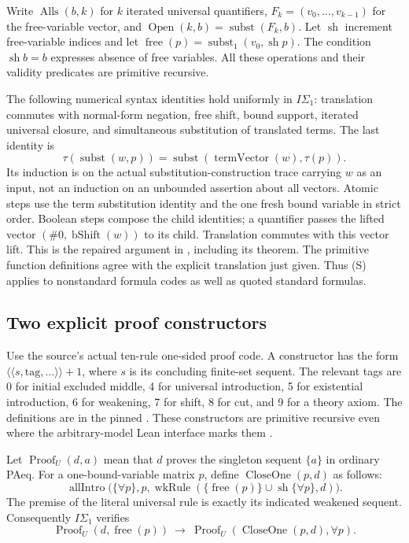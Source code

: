 Write $\operatorname{Alls}(b,k)$ for $k$ iterated universal quantifiers,
$F_k=(v_0,\ldots,v_{k-1})$ for the free-variable vector, and
$\operatorname{Open}(k,b)=\operatorname{subst}(F_k,b)$.
Let $\operatorname{sh}$ increment free-variable indices and let
$\operatorname{free}(p)=\operatorname{subst}_1(v_0,\operatorname{sh}p)$.
The condition $\operatorname{sh}b=b$ expresses absence of free variables.
All these operations and their validity predicates are primitive recursive.

The following numerical syntax identities hold uniformly in $I\Sigma_1$:
translation commutes with normal-form negation, free shift, bound support,
iterated universal closure, and simultaneous substitution of translated
terms.  The last identity is
\[
 \tau(\operatorname{subst}(w,p))
 =\operatorname{subst}(\operatorname{termVector}(w),\tau(p)) . \tag{S}
\]
Its induction is on the actual substitution-construction trace carrying
$w$ as an input, not an induction on an unbounded assertion about all
vectors.  Atomic steps use the term substitution identity and the one
fresh bound variable in strict order.  Boolean steps compose the child
identities; a quantifier passes the lifted vector
$(\#0,\operatorname{bShift}(w))$ to its child.  Translation commutes with
this vector lift.  This is the repaired argument in
, including its
 theorem.  The primitive function
definitions agree with the explicit translation just given.  Thus (S)
applies to nonstandard formula codes as well as quoted standard formulas.

\subsection{Two explicit proof constructors}

Use the source's actual ten-rule one-sided proof code.  A constructor has
the form $\langle\!\langle s,\mathrm{tag},\ldots\rangle\!\rangle+1$,
where $s$ is its concluding finite-set sequent.  The relevant tags are
0 for initial excluded middle, 4 for universal introduction, 5 for
existential introduction, 6 for weakening, 7 for shift, 8 for cut,
and 9 for a theory axiom.  The definitions are in the pinned
.  These constructors are
primitive recursive even where the arbitrary-model Lean interface marks
them .

Let $\operatorname{Proof}_U(d,a)$ mean that $d$ proves the singleton
sequent $\{a\}$ in ordinary PAeq.  For a one-bound-variable matrix $p$,
define $\operatorname{CloseOne}(p,d)$ as follows:
\[
 \operatorname{allIntro}\bigl(\{\forall p\},p,
   \operatorname{wkRule}(\{\operatorname{free}(p)\}
        \cup\operatorname{sh}\{\forall p\},d)\bigr).       \tag{C1}
\]
The premise of the literal universal rule is exactly its indicated
weakened sequent.  Consequently $I\Sigma_1$ verifies
\[
 \operatorname{Proof}_U(d,\operatorname{free}(p))
 \ \longrightarrow\ \operatorname{Proof}_U(\operatorname{CloseOne}(p,d),\forall p).
\]

